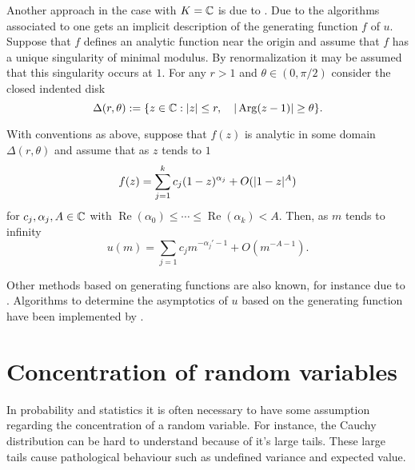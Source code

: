    Another approach in the case with $K = \mathbb{C}$ is due to \cite{flajolet1990singularity}.
    Due to the algorithms associated to  one gets an implicit description of the generating function $f$ of $u$.
    Suppose that $f$ defines an analytic function near the origin and assume that $f$ has a unique singularity of minimal modulus.
    By renormalization it may be assumed that this singularity occurs at $1$.
    For any $r>1$ and $\theta \in (0,\pi/2)$  consider the closed indented disk
    $$\Delta(r,\theta) := \{z\in \mathbb{C}: \vert z \vert\leq r, \quad \vert \operatorname{Arg}(z-1) \vert\geq \theta\}.$$
    \begin{theorem}{\cite[Corollary 3]{flajolet1990singularity}}
      With conventions as above, suppose that $f(z)$ is analytic in some domain $\Delta(r,\theta)$ and assume that as $z$ tends to $1$
      $$f(z) = \sum_{j=1}^k c_{j}(1-z)^{\alpha_j} + O(\vert 1-z \vert^A)$$
      for $c_j,\alpha_j,A\in \mathbb{C}$ with $\operatorname{Re}(\alpha_0)\leq \cdots \leq \operatorname{Re}(\alpha_k)<A$.
      Then, as $m$ tends to infinity
      $$u(m) = \sum_{j=1}c_j m^{-\alpha_j' - 1} + O(m^{-A -1}).$$
    \end{theorem}
    Other methods based on generating functions are also known, for instance due to \cite{hayman1956generalisation}.
    Algorithms to determine the asymptotics of $u$ based on the generating function have been implemented by \cite{salvy1991examples}.
\section{Concentration of random variables}\label{sec: SubGSubE}
In probability and statistics it is often necessary to have some assumption regarding the concentration of a random variable.
For instance, the Cauchy distribution can be hard to understand because of it's large tails.
These large tails cause pathological behaviour such as undefined variance and expected value.

